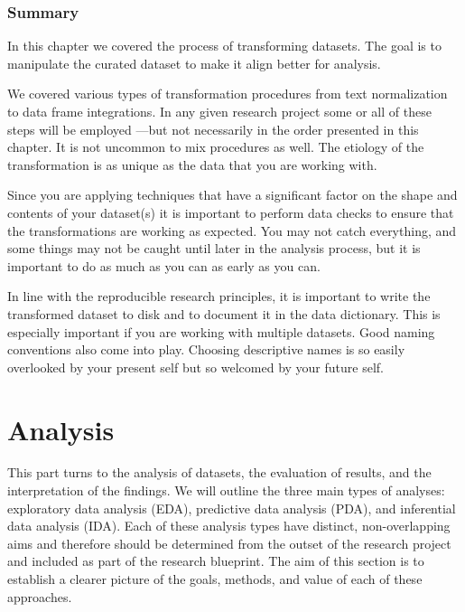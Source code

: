 \documentclass[
  letterpaper,
  krantz1]{latex/krantz-mod}
\theoremstyle{definition}
\theoremstyle{definition}
\theoremstyle{remark}
\begin{document}
\section*{Summary}\label{summary-6}


In this chapter we covered the process of transforming datasets. The
goal is to manipulate the curated dataset to make it align better for
analysis.

We covered various types of transformation procedures from text
normalization to data frame integrations. In any given research project
some or all of these steps will be employed ---but not necessarily in
the order presented in this chapter. It is not uncommon to mix
procedures as well. The etiology of the transformation is as unique as
the data that you are working with.

Since you are applying techniques that have a significant factor on the
shape and contents of your dataset(s) it is important to perform data
checks to ensure that the transformations are working as expected. You
may not catch everything, and some things may not be caught until later
in the analysis process, but it is important to do as much as you can as
early as you can.

In line with the reproducible research principles, it is important to
write the transformed dataset to disk and to document it in the data
dictionary. This is especially important if you are working with
multiple datasets. Good naming conventions also come into play. Choosing
descriptive names is so easily overlooked by your present self but so
welcomed by your future self.

\part{Analysis}

This part turns to the analysis of datasets, the evaluation of results,
and the interpretation of the findings. We will outline the three main
types of analyses: exploratory data analysis (EDA), predictive data
analysis (PDA), and inferential data analysis (IDA). Each of these
analysis types have distinct, non-overlapping aims and therefore should
be determined from the outset of the research project and included as
part of the research blueprint. The aim of this section is to establish
a clearer picture of the goals, methods, and value of each of these
approaches.
\end{document}
